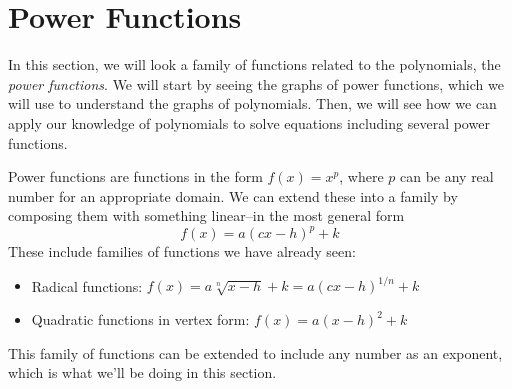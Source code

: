\section{Power Functions}
In this section, we will look a family of functions related to the polynomials, the \emph{power functions}. We will start by seeing the graphs of power functions, which we will use to understand the graphs of polynomials. Then, we will see how we can apply our knowledge of polynomials to solve equations including several power functions.

Power functions are functions in the form $f(x)=x^p$, where $p$ can be any real number for an appropriate domain. We can extend these into a family by composing them with something linear--in the most general form
$$f(x)=a(cx-h)^p+k$$
These include families of functions we have already seen:
\begin{itemize}
\item Radical functions: $f(x)=a\sqrt[n]{x-h}+k=a(cx-h)^{1/n}+k$
\item Quadratic functions in vertex form: $f(x)=a(x-h)^2+k$
\end{itemize}
This family of functions can be extended to include any number as an exponent, which is what we'll be doing in this section.




%
%
%
%
%
%
%





